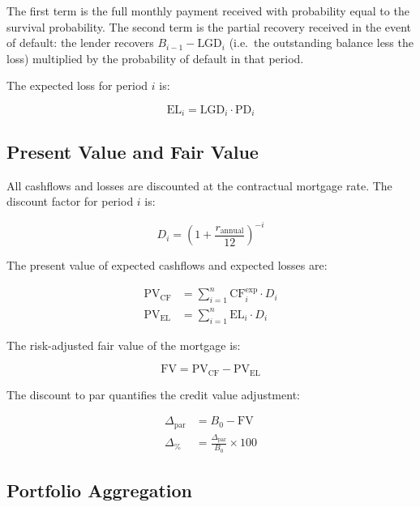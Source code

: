 \documentclass[11pt,a4paper]{article}
\begin{document}
\noindent The first term is the full monthly payment received with probability equal to
the survival probability. The second term is the partial recovery received in the event
of default: the lender recovers $B_{i-1} - \text{LGD}_i$ (i.e.\ the outstanding balance
less the loss) multiplied by the probability of default in that period.

The expected loss for period $i$ is:

\begin{equation}
\label{eq:expected_loss}
\text{EL}_i = \text{LGD}_i \cdot \text{PD}_i
\end{equation}

\subsection{Present Value and Fair Value}
\label{sec:pv}

All cashflows and losses are discounted at the contractual mortgage rate. The discount
factor for period $i$ is:

\begin{equation}
\label{eq:discount_factor}
D_i = \left(1 + \frac{r_{\text{annual}}}{12}\right)^{-i}
\end{equation}

The present value of expected cashflows and expected losses are:

\begin{align}
\text{PV}_{\text{CF}} &= \sum_{i=1}^{n} \text{CF}_i^{\text{exp}} \cdot D_i \label{eq:pv_cf} \\
\text{PV}_{\text{EL}} &= \sum_{i=1}^{n} \text{EL}_i \cdot D_i \label{eq:pv_el}
\end{align}

The risk-adjusted fair value of the mortgage is:

\begin{equation}
\label{eq:fair_value}
\text{FV} = \text{PV}_{\text{CF}} - \text{PV}_{\text{EL}}
\end{equation}

The discount to par quantifies the credit value adjustment:

\begin{align}
\Delta_{\text{par}} &= B_0 - \text{FV} \label{eq:discount_abs} \\
\Delta_{\%} &= \frac{\Delta_{\text{par}}}{B_0} \times 100 \label{eq:discount_pct}
\end{align}

\subsection{Portfolio Aggregation}
\label{sec:portfolio}
\end{document}
